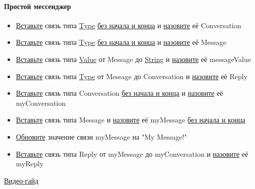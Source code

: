 \paragraph{Простой мессенджер}
\begin{itemize}
      \item \hyperlink{DeepCase.InsertLink.Description}{Вставьте} связь типа
            \hyperlink{Core.Type.Description}{Type}
            \hyperlink{FAQ.HowToInsertLinkWithoutFromAndTo}{без
                  начала и конца} и \hyperlink{FAQ.HowToSetName}{назовите} её
            Conversation
      \item \hyperlink{DeepCase.InsertLink.Description}{Вставьте} связь типа
            \hyperlink{Core.Type.Description}{Type}
            \hyperlink{FAQ.HowToInsertLinkWithoutFromAndTo}{без
                  начала и конца} и
            \hyperlink{FAQ.HowToSetName}{назовите} её Message
      \item \hyperlink{DeepCase.InsertLink.Description}{Вставьте} связь типа
            \hyperlink{Core.Value.Description}{Value} от Message до
            \hyperlink{Core.String.Description}{String} и
            \hyperlink{FAQ.HowToSetName}{назовите} её messageValue
      \item \hyperlink{DeepCase.InsertLink.Description}{Вставьте} связь типа
            \hyperlink{Core.Type.Description}{Type} от Message до Conversation
            и
            \hyperlink{FAQ.HowToSetName}{назовите} её Reply
      \item \hyperlink{DeepCase.InsertLink.Description}{Вставьте} связь типа
            Conversation
            \hyperlink{FAQ.HowToInsertLinkWithoutFromAndTo}{без начала и конца} и
            \hyperlink{FAQ.HowToSetName}{назовите} её myConversation
      \item \hyperlink{DeepCase.InsertLink.Description}{Вставьте} связь типа
            Message и \hyperlink{FAQ.HowToSetName}{назовите} её myMessage
            \hyperlink{FAQ.HowToInsertLinkWithoutFromAndTo}{без начала и конца}
      \item \hyperlink{DeepCase.UpdateLink.Description}{Обновите} значение связи
            myMessage на "My Message!"
      \item \hyperlink{DeepCase.InsertLink.Description}{Вставьте} связь типа
            Reply от
            myMessage до myConversation и \hyperlink{FAQ.HowToSetName}{назовите} её
            myReply
\end{itemize}
\href{https://youtu.be/1ihR5gZrw6M}{Видео-гайд}
